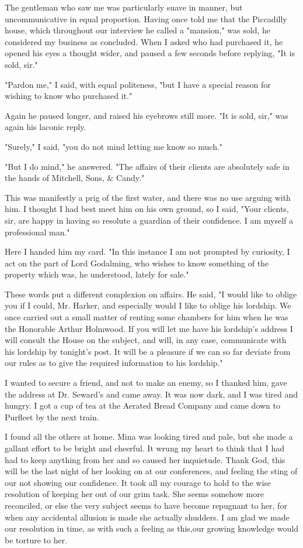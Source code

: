 The gentleman who saw me was particularly suave in manner, but uncommunicative in equal proportion. Having once told me that the Piccadilly house, which throughout our interview he called a "mansion," was sold, he considered my business as concluded. When I asked who had purchased it, he opened his eyes a thought wider, and paused a few seconds before replying, "It is sold, sir." 

"Pardon me," I said, with equal politeness, "but I have a special reason for wishing to know who purchased it." 

Again he paused longer, and raised his eyebrows still more. "It is sold, sir," was again his laconic reply. 

"Surely," I said, "you do not mind letting me know so much." 

"But I do mind," he answered. "The affairs of their clients are absolutely safe in the hands of Mitchell, Sons, & Candy." 

This was manifestly a prig of the first water, and there was no use arguing with him. I thought I had best meet him on his own ground, so I said, "Your clients, sir, are happy in having so resolute a guardian of their confidence. I am myself a professional man." 

Here I handed him my card. "In this instance I am not prompted by curiosity, I act on the part of Lord Godalming, who wishes to know something of the property which was, he understood, lately for sale." 

These words put a different complexion on affairs. He said, "I would like to oblige you if I could, Mr. Harker, and especially would I like to oblige his lordship. We once carried out a small matter of renting some chambers for him when he was the Honorable Arthur Holmwood. If you will let me have his lordship's address I will consult the House on the subject, and will, in any case, communicate with his lordship by tonight's post. It will be a pleasure if we can so far deviate from our rules as to give the required information to his lordship." 

I wanted to secure a friend, and not to make an enemy, so I thanked him, gave the address at Dr. Seward's and came away. It was now dark, and I was tired and hungry. I got a cup of tea at the Aerated Bread Company and came down to Purfleet by the next train. 

I found all the others at home. Mina was looking tired and pale, but she made a gallant effort to be bright and cheerful. It wrung my heart to think that I had had to keep anything from her and so caused her inquietude. Thank God, this will be the last night of her looking on at our conferences, and feeling the sting of our not showing our confidence. It took all my courage to hold to the wise resolution of keeping her out of our grim task. She seems somehow more reconciled, or else the very subject seems to have become repugnant to her, for when any accidental allusion is made she actually shudders. I am glad we made our resolution in time, as with such a feeling as this,our growing knowledge would be torture to her. 

